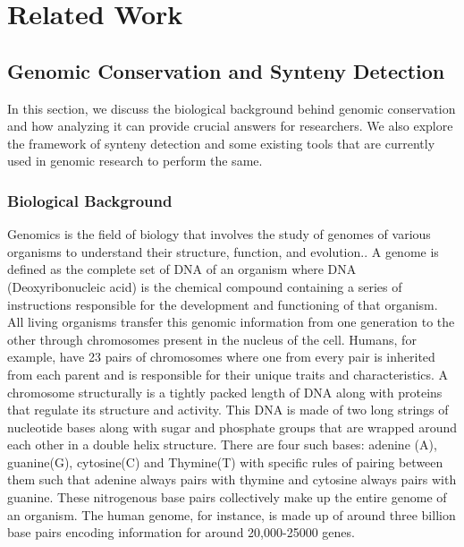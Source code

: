\chapter{Related Work}

\section{Genomic Conservation and Synteny Detection}
In this section, we discuss the biological background behind genomic conservation and how analyzing it can provide crucial answers for researchers. We also explore the framework of synteny detection and some existing tools that are currently used in genomic research to perform the same.

\subsection{Biological Background}

Genomics is the field of biology that involves the study of genomes of various organisms to understand their structure, function, and evolution.\cite{world2002genomics}. A genome is defined as the complete set of DNA of an organism where DNA (Deoxyribonucleic acid) is the chemical compound containing a series of instructions responsible for the development and functioning of that organism\cite{genomegov}. All living organisms transfer this genomic information from one generation to the other through chromosomes present in the nucleus of the cell. Humans, for example, have 23 pairs of chromosomes where one from every pair is inherited from each parent and is responsible for their unique traits and characteristics. A chromosome structurally is a tightly packed length of DNA along with proteins that regulate its structure and activity. This DNA is made of two long strings of nucleotide bases along with sugar and phosphate groups that are wrapped around each other in a double helix structure. There are four such bases: adenine (A), guanine(G), cytosine(C) and Thymine(T) with specific rules of pairing between them such that adenine always pairs with thymine and cytosine always pairs with guanine. These nitrogenous base pairs collectively make up the entire genome of an organism\cite{ussery2009computing}. The human genome, for instance, is made up of around three billion base pairs encoding information for around 20,000-25000 genes\cite{international2004finishing}. 


